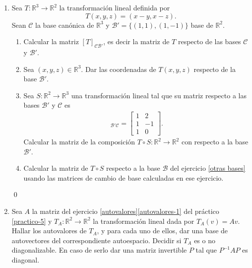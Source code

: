 \begin{enumerate}[topsep=6pt, itemsep=.4cm]
\rta


\qed


\item\label{matriz transformaciones ejemplo} Sea 
$T:\mathbb{R}^3\longrightarrow\mathbb{R}^2$ la transformación lineal definida por $$T(x,y,z)=(x-y,x-z).$$ Sean $\mathcal{C}$ la base canónica de $\mathbb{R}^3$ y $\mathcal{B}'=\{(1,1),(1,-1)\}$ base de $\mathbb{R}^2$.
\begin{enumerate}
    \item\label{matriz transformaciones ejemplo-a} Calcular la matriz $[T]_{\mathcal{C}\mathcal{B}'}$, es decir la matriz de $T$ respecto de las bases $\mathcal{C}$ y $\mathcal{B}'$.
    \item\label{matriz transformaciones ejemplo-b} Sea $(x,y,z)\in\mathbb{R}^3$. Dar las coordenadas de $T(x,y,z)$ respecto de la base $\mathcal{B}'$.
    \item\label{matriz transformaciones ejemplo-c} Sea $S:\mathbb{R}^2\longrightarrow\mathbb{R}^3$ una transformación lineal tal que su matriz respecto a las bases $\mathcal{B}'$ y $\mathcal{C}$ es
    \begin{align*}
    [S]_{\mathcal{B}'\mathcal{C}}=\begin{bmatrix}
    1&2\\1&-1\\1&0
    \end{bmatrix}. 
    \end{align*}
    Calcular la matriz de la composición $T\circ S:\mathbb{R}^2\longrightarrow\mathbb{R}^2$ con respecto a la base $\mathcal{B}'$. 
    \item\label{matriz transformaciones ejemplo-d} Calcular la matriz de $T\circ S$ respecto a la base $\mathcal{B}$ del ejercicio \ref{otras bases} usando las matrices de cambio de base calculadas en ese ejercicio.
\end{enumerate}

\rta


\qed



\item Sea $A$ la matriz  del ejercicio \ref{autovalores}\ref{autovalores-1} del práctico \ref{practico-5} y $T_A:\mathbb{R}^2\longrightarrow\mathbb{R}^2$ la transformación lineal dada por $T_A(v)=Av$. Hallar los autovalores de $T_A$, y para cada uno de ellos, dar una base de autovectores del correspondiente autoespacio. Decidir si $T_A$ es o no diagonalizable. En caso de serlo dar una matriz invertible $P$ tal que $P^{-1}AP$ es diagonal. 


\end{enumerate}

